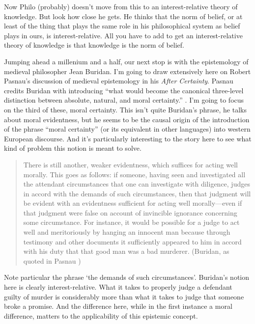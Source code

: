 \documentclass[
  11pt,
]{book}
\begin{document}
Now Philo (probably) doesn't move from this to an interest-relative theory of knowledge. But look how close he gets. He thinks that the norm of belief, or at least of the thing that plays the same role in his philosophical system as belief plays in ours, is interest-relative. All you have to add to get an interest-relative theory of knowledge is that knowledge is the norm of belief.

Jumping ahead a millenium and a half, our next stop is with the epistemology of medieval philosopher Jean Buridan. I'm going to draw extensively here on Robert Pasnau's discussion of medieval epistemology in his \emph{After Certainty}. Pasnau credits Buridan with introducing ``what would become the canonical three-level distinction between absolute, natural, and moral certainty.'' \citep[32]{Pasnau2017}. I'm going to focus on the third of these, moral certainty. This isn't quite Buridan's phrase, he talks about moral evidentness, but he seems to be the causal origin of the introduction of the phrase ``moral certainty'' (or its equivalent in other languages) into western European discourse. And it's particularly interesting to the story here to see what kind of problem this notion is meant to solve.

\begin{quote}
There is still another, weaker evidentness, which suffices for acting well morally. This goes as follows: if someone, having seen and investigated all the attendant circumstances that one can investigate with diligence, judges in accord with the demands of such circumstances, then that judgment will be evident with an evidentness sufficient for acting well morally---even if that judgment were false on account of invincible ignorance concerning some circumstance. For instance, it would be possible for a judge to act well and meritoriously by hanging an innocent man because through testimony and other documents it sufficiently appeared to him in accord with his duty that that good man was a bad murderer. (Buridan, as quoted in Pasnau \citeyearpar[34]{Pasnau2017})
\end{quote}

Note particular the phrase `the demands of such circumstances'. Buridan's notion here is clearly interest-relative. What it takes to properly judge a defendant guilty of murder is considerably more than what it takes to judge that someone broke a promise. And the difference here, while in the first instance a moral difference, matters to the applicability of this epistemic concept.
\end{document}
